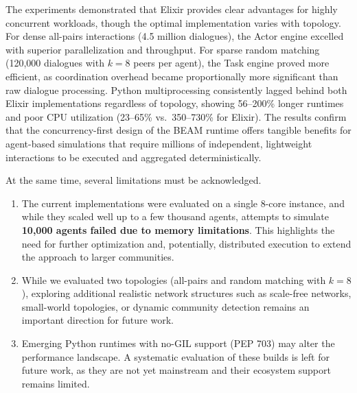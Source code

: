 \documentclass[
]{ceurart}
\begin{document}
The experiments demonstrated that Elixir provides clear advantages for highly concurrent workloads, though the optimal implementation varies with topology. For dense all-pairs interactions (4.5 million dialogues), the Actor engine excelled with superior parallelization and throughput. For sparse random matching (120,000 dialogues with $k=8$ peers per agent), the Task engine proved more efficient, as coordination overhead became proportionally more significant than raw dialogue processing. Python multiprocessing consistently lagged behind both Elixir implementations regardless of topology, showing 56--200\% longer runtimes and poor CPU utilization (23--65\% vs.\ 350--730\% for Elixir). The results confirm that the concurrency-first design of the BEAM runtime offers tangible benefits for agent-based simulations that require millions of independent, lightweight interactions to be executed and aggregated deterministically.

At the same time, several limitations must be acknowledged. 
\begin{enumerate}
    \item The current implementations were evaluated on a single 8-core instance, and while they scaled well up to a few thousand agents, attempts to simulate \textbf{10,000 agents failed due to memory limitations}. This highlights the need for further optimization and, potentially, distributed execution to extend the approach to larger communities. 
    \item While we evaluated two topologies (all-pairs and random matching with $k=8$), exploring additional realistic network structures such as scale-free networks, small-world topologies, or dynamic community detection remains an important direction for future work. 
    \item Emerging Python runtimes with no-GIL support (PEP 703) may alter the performance landscape. A systematic evaluation of these builds is left for future work, as they are not yet mainstream and their ecosystem support remains limited.
\end{enumerate}
\end{document}
